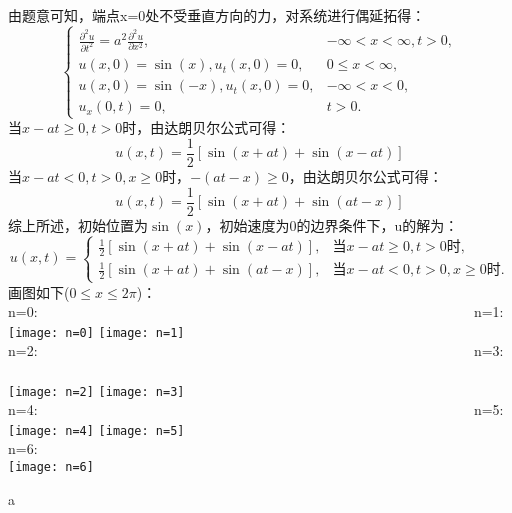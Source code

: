 \documentclass[10.5pt]{article}
\begin{document}
\section{}
由题意可知，端点x=0处不受垂直方向的力，对系统进行偶延拓得：$$\begin{cases}
    \frac{\partial^2u}{\partial t^2}=a^2\frac{\partial^2u}{\partial x^2},& -\infty<x<\infty,t>0,\\
    u(x,0)=\sin(x),u_t(x,0)=0,& 0\leqslant x<\infty,\\
    u(x,0)=\sin(-x),u_t(x,0)=0,& -\infty<x<0,\\
    u_x(0,t)=0,&t>0.
\end{cases}$$\indent
当$x-at\geqslant 0,t>0$时，由达朗贝尔公式可得：$$u(x,t) = \frac{1}{2}\left[\sin(x+at)+\sin(x-at)\right]$$\indent
当$x-at<0,t>0,x\geqslant 0$时，$-(at-x)\geqslant 0$，由达朗贝尔公式可得：$$u(x,t)=\frac{1}{2}\left[\sin(x+at)+\sin(at-x)\right]$$\indent
综上所述，初始位置为$\sin(x)$，初始速度为0的边界条件下，u的解为：$$u(x,t)=\begin{cases}
    \frac{1}{2}\left[\sin(x+at)+\sin(x-at)\right],&\text{当}x-at\geqslant 0,t>0\text{时},\\
    \frac{1}{2}\left[\sin(x+at)+\sin(at-x)\right],&\text{当}x-at< 0,t>0,x\geqslant 0\text{时}.
\end{cases}$$\indent
画图如下($0\leqslant x\leqslant 2\pi$)：\\\indent
n=0: ~~~~~~~~~~~~~~~~~~~~~~~~~~~~~~~~~~~~~~~ ~~~~~~~~~~~~~~~~~~~~~~n=1:\\
\texttt{[image: n=0]}
\texttt{[image: n=1]}\\\indent
n=2: ~~~~~~~~~~~~~~~~~~~~~~~~~~~~~~~~~~~~~~~ ~~~~~~~~~~~~~~~~~~~~~~n=3:\\\\
\texttt{[image: n=2]}
\texttt{[image: n=3]}\\\indent
n=4: ~~~~~~~~~~~~~~~~~~~~~~~~~~~~~~~~~~~~~~~ ~~~~~~~~~~~~~~~~~~~~~~n=5:\\
\texttt{[image: n=4]}
\texttt{[image: n=5]}\\\indent
n=6:\\
\texttt{[image: n=6]}

\newpage
a
\end{document}
